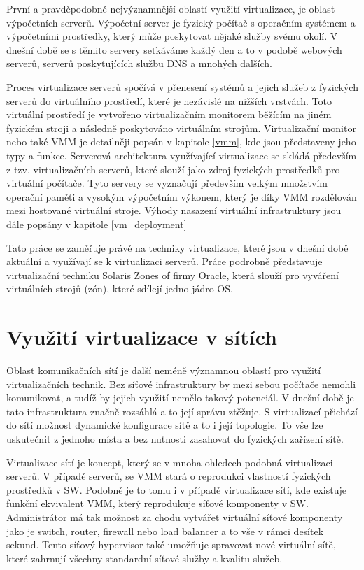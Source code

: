 První a pravděpodobně nejvýznamnější oblastí využití virtualizace, je oblast výpočetních serverů. Výpočetní server je fyzický počítač s operačním systémem a výpočetními prostředky, který může poskytovat nějaké služby svému okolí.
V dnešní době se s těmito servery setkáváme každý den a to v podobě webových serverů, serverů poskytujících službu DNS a mnohých dalších.

Proces virtualizace serverů spočívá v přenesení systémů a jejich služeb z fyzických serverů do virtuálního prostředí, které je nezávislé na nižších vrstvách. Toto virtuální prostředí je vytvořeno virtualizačním monitorem běžícím na jiném fyzickém stroji a následně poskytováno virtuálním strojům.
Virtualizační monitor nebo také VMM je detailněji popsán v kapitole \ref{vmm}, kde jsou představeny jeho typy a funkce. Serverová architektura využívající virtualizace se skládá především z tzv. virtualizačních serverů, které slouží jako zdroj fyzických
prostředků pro virtuální počítače. Tyto servery se vyznačují především velkým množstvím operační paměti a vysokým výpočetním výkonem, který je díky VMM rozdělován mezi hostované virtuální stroje. Výhody nasazení virtuální infrastruktury jsou dále
popsány v kapitole \ref{vm_deployment}

Tato práce se zaměřuje právě na techniky virtualizace, které jsou v dnešní době aktuální a využívají se k virtualizaci serverů. Práce podrobně představuje virtualizační techniku Solaris Zones of firmy Oracle, která slouží pro
vyváření virtuálních strojů (zón), které sdílejí jedno jádro OS.

\section{Využití virtualizace v sítích}

Oblast komunikačních sítí je další neméně významnou oblastí pro využití virtualizačních technik. Bez síťové infrastruktury by mezi sebou počítače nemohli komunikovat, a tudíž by jejich využití nemělo takový potenciál. V dnešní době
je tato infrastruktura značně rozsáhlá a to její správu ztěžuje. S virtualizací přichází do sítí možnost dynamické konfigurace sítě a to i její topologie. To vše lze uskutečnit z jednoho místa a bez nutnosti zasahovat do fyzických zařízení sítě.


Virtualizace sítí je koncept, který se v mnoha ohledech podobná virtualizaci serverů. V případě serverů, se VMM stará o reprodukci vlastností fyzických prostředků v SW. Podobně je to tomu i v případě virtualizace sítí, kde existuje funkční ekvivalent VMM,
který reprodukuje síťové komponenty v SW. Administrátor má tak možnost za chodu vytvářet virtuální síťové komponenty jako je switch, router, firewall nebo load balancer a to vše v rámci desítek sekund. Tento síťový hypervisor
také umožňuje spravovat nové virtuální sítě, které zahrnují všechny standardní síťové služby a kvalitu služeb.\cite{vn}

